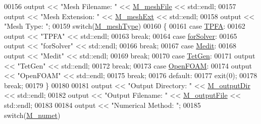\begin{DoxyCode}
00156     output << \textcolor{stringliteral}{"Mesh Filename: "} << \hyperlink{classFVCode3D_1_1Data_ab939b8425e4b01d2c000adfb0ea2d35a}{M\_meshFile} << std::endl;
00157     output << \textcolor{stringliteral}{"Mesh Extension: "} << \hyperlink{classFVCode3D_1_1Data_a6808fd51d3a0b46b77ddd500c836abb9}{M\_meshExt} << std::endl;
00158     output << \textcolor{stringliteral}{"Mesh Type: "};
00159     \textcolor{keywordflow}{switch}(\hyperlink{classFVCode3D_1_1Data_a3829da70dbf5688d6188ec0108bae59d}{M\_meshType})
00160     \{
00161         \textcolor{keywordflow}{case} \hyperlink{classFVCode3D_1_1Data_a6a9aa6abc2ca3c85be8578d82a61a9c6a41e16e40b05a40c861dae13e7d056daf}{TPFA}:
00162             output << \textcolor{stringliteral}{"TPFA"} << std::endl;
00163             \textcolor{keywordflow}{break};
00164         \textcolor{keywordflow}{case} \hyperlink{classFVCode3D_1_1Data_a6a9aa6abc2ca3c85be8578d82a61a9c6aa97c4d4a0aa98b96be77e4d0a5e1e8fb}{forSolver}:
00165             output << \textcolor{stringliteral}{"forSolver"} << std::endl;
00166             \textcolor{keywordflow}{break};
00167         \textcolor{keywordflow}{case} \hyperlink{classFVCode3D_1_1Data_a6a9aa6abc2ca3c85be8578d82a61a9c6a5122019b85fafb0f64f79baf96593d52}{Medit}:
00168             output << \textcolor{stringliteral}{"Medit"} << std::endl;
00169             \textcolor{keywordflow}{break};
00170         \textcolor{keywordflow}{case} \hyperlink{classFVCode3D_1_1Data_a6a9aa6abc2ca3c85be8578d82a61a9c6a801f19d5251b0e21edfed0b05fb1ac99}{TetGen}:
00171             output << \textcolor{stringliteral}{"TetGen"} << std::endl;
00172             \textcolor{keywordflow}{break};
00173         \textcolor{keywordflow}{case} \hyperlink{classFVCode3D_1_1Data_a6a9aa6abc2ca3c85be8578d82a61a9c6a568f155439735c175038b49a538cd6ce}{OpenFOAM}:
00174             output << \textcolor{stringliteral}{"OpenFOAM"} << std::endl;
00175             \textcolor{keywordflow}{break};
00176         \textcolor{keywordflow}{default}:
00177             exit(0);
00178             \textcolor{keywordflow}{break};
00179     \}
00180 
00181     output << \textcolor{stringliteral}{"Output Directory: "} << \hyperlink{classFVCode3D_1_1Data_af5685db93f1e6c697fa63241351d1bcd}{M\_outputDir} << std::endl;
00182     output << \textcolor{stringliteral}{"Output Filename: "} << \hyperlink{classFVCode3D_1_1Data_a34713b7f3fd7176b0745f902713722dd}{M\_outputFile} << std::endl;
00183 
00184     output << \textcolor{stringliteral}{"Numerical Method: "};
00185     \textcolor{keywordflow}{switch}(\hyperlink{classFVCode3D_1_1Data_acabd10057aa8ce14f50ee7fbd354ac64}{M\_numet})

\end{DoxyCode}
